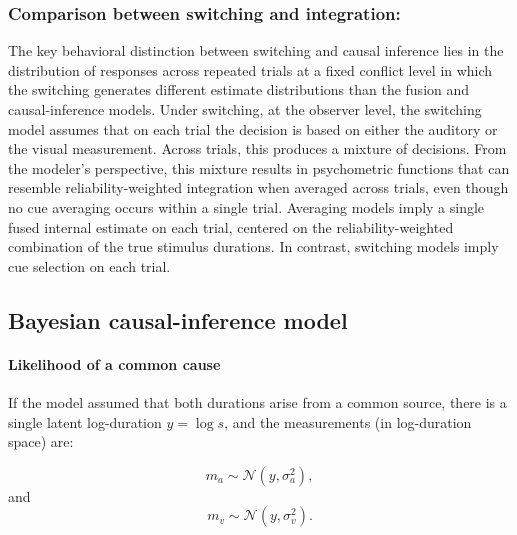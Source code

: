 \documentclass{jov}
\begin{document}
\subsubsection{Comparison between switching and integration:}
The key behavioral distinction between switching and causal inference lies in the distribution of responses across repeated trials at a fixed conflict level in which the switching generates different estimate distributions than the fusion and causal-inference models. Under switching, at the observer level, the switching model assumes that on each trial the decision is based on either the auditory or the visual measurement. Across trials, this produces a mixture of decisions. From the modeler's perspective, this mixture results in psychometric functions that can resemble reliability-weighted integration when averaged across trials, even though no cue averaging occurs within a single trial. Averaging models imply a single fused internal estimate on each trial, centered on the reliability-weighted combination of the true stimulus durations. In contrast, switching models imply cue selection on each trial.

\subsection{Bayesian causal-inference model}\label{causal_inf_equations}

\paragraph{Likelihood of a common cause}

If the model assumed that both durations arise from a common source, there is a single latent log-duration $y = \log s$, and the measurements (in log-duration space) are:

\begin{equation}
\label{eq:ma_given_y}
m_a \sim \mathcal{N}(y, \sigma_a^2),
\end{equation}
and
\begin{equation}
\label{eq:mv_given_y}
m_v \sim \mathcal{N}(y, \sigma_v^2).
\end{equation}
\end{document}
